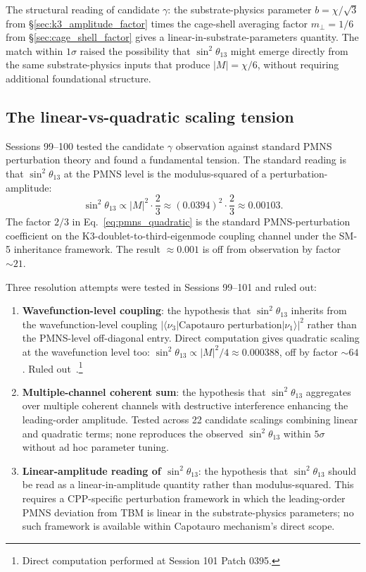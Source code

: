 \documentclass[11pt,letterpaper]{article}
\begin{document}
The structural reading of candidate $\gamma$: the substrate-physics parameter $b = \chi/\sqrt{3}$ from \S\ref{sec:k3_amplitude_factor} times the cage-shell averaging factor $m_\perp = 1/6$ from \S\ref{sec:cage_shell_factor} gives a linear-in-substrate-parameters quantity. The match within $1\sigma$ raised the possibility that $\sin^2\theta_{13}$ might emerge directly from the same substrate-physics inputs that produce $|M| = \chi/6$, without requiring additional foundational structure.

\subsection{The linear-vs-quadratic scaling tension}\label{sec:scaling_tension}

Sessions 99--100 tested the candidate $\gamma$ observation against standard PMNS perturbation theory and found a fundamental tension. The standard reading is that $\sin^2\theta_{13}$ at the PMNS level is the modulus-squared of a perturbation-amplitude:
\begin{equation}\label{eq:pmns_quadratic}
\sin^2\theta_{13} \propto |M|^2 \cdot \frac{2}{3} \approx (0.0394)^2 \cdot \frac{2}{3} \approx 0.00103.
\end{equation}
The factor $2/3$ in Eq.~\eqref{eq:pmns_quadratic} is the standard PMNS-perturbation coefficient on the K3-doublet-to-third-eigenmode coupling channel under the SM-5 inheritance framework. The result $\approx 0.001$ is off from observation by factor $\sim 21$.

Three resolution attempts were tested in Sessions 99--101 and ruled out:

\begin{enumerate}\setlength\itemsep{0.2em}
    \item \textbf{Wavefunction-level coupling}: the hypothesis that $\sin^2\theta_{13}$ inherits from the wavefunction-level coupling $|\langle \nu_3 | \text{Capotauro perturbation} | \nu_1 \rangle|^2$ rather than the PMNS-level off-diagonal entry. Direct computation gives quadratic scaling at the wavefunction level too: $\sin^2\theta_{13} \propto |M|^2 / 4 \approx 0.000388$, off by factor $\sim 64$. Ruled out~\cite{abshier_capotauro_subclaim_c_sketch}.\footnote{Direct computation performed at Session 101 Patch 0395.}
    \item \textbf{Multiple-channel coherent sum}: the hypothesis that $\sin^2\theta_{13}$ aggregates over multiple coherent channels with destructive interference enhancing the leading-order amplitude. Tested across 22 candidate scalings combining linear and quadratic terms; none reproduces the observed $\sin^2\theta_{13}$ within $5\sigma$ without ad hoc parameter tuning.
    \item \textbf{Linear-amplitude reading of $\sin^2\theta_{13}$}: the hypothesis that $\sin^2\theta_{13}$ should be read as a linear-in-amplitude quantity rather than modulus-squared. This requires a CPP-specific perturbation framework in which the leading-order PMNS deviation from TBM is linear in the substrate-physics parameters; no such framework is available within Capotauro mechanism's direct scope.
\end{enumerate}
\end{document}
